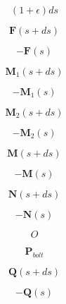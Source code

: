 \documentclass[a4paper,10pt,fleqn]{book}
\newcommand{\vect}[1]{\boldsymbol{#1}}
\begin{document}


\begin{equation}
(1+\epsilon) ds
\end{equation}


\begin{equation}
\vect{F}(s+ds)
\end{equation}


\begin{equation}
-\vect{F}(s)
\end{equation}


\begin{equation}
\vect{M}_{1}(s+ds)
\end{equation}


\begin{equation}
-\vect{M}_{1}(s)
\end{equation}


\begin{equation}
\vect{M}_{2}(s+ds)
\end{equation}


\begin{equation}
-\vect{M}_{2}(s)
\end{equation}


\begin{equation}
\vect{M}(s+ds)
\end{equation}


\begin{equation}
-\vect{M}(s)
\end{equation}


\begin{equation}
\vect{N}(s+ds)
\end{equation}


\begin{equation}
-\vect{N}(s)
\end{equation}


\begin{equation}
O
\end{equation}


\begin{equation}
\vect{P}_{bolt}
\end{equation}


\begin{equation}
\vect{Q}(s+ds)
\end{equation}


\begin{equation}
-\vect{Q}(s)
\end{equation}
\end{document}

